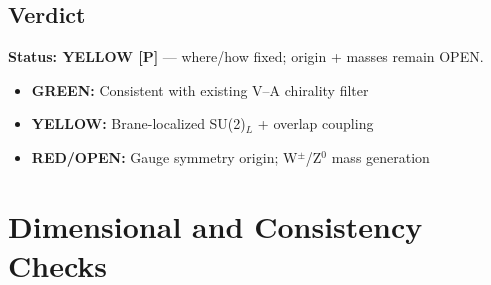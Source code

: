 \subsection{Verdict}

\begin{tcolorbox}[colback=yellow!5!white, colframe=yellow!60!black,
    title=OPR-17: Minimal SU(2)$_L$ Embedding]
\textbf{Status: YELLOW [P]} --- where/how fixed; origin + masses remain OPEN.

\begin{itemize}[nosep]
    \item \textcolor{OliveGreen}{\textbf{GREEN:}} Consistent with existing V--A chirality filter \tagDc{}
    \item \textcolor{YellowOrange}{\textbf{YELLOW:}} Brane-localized SU(2)$_L$ + overlap coupling \tagP{}
    \item \textcolor{BrickRed}{\textbf{RED/OPEN:}} Gauge symmetry origin; W$^\pm$/Z$^0$ mass generation
\end{itemize}

\medskip
\noindent{}
\end{tcolorbox}

\section{Dimensional and Consistency Checks}
\label{sec:ch9_consistency}

